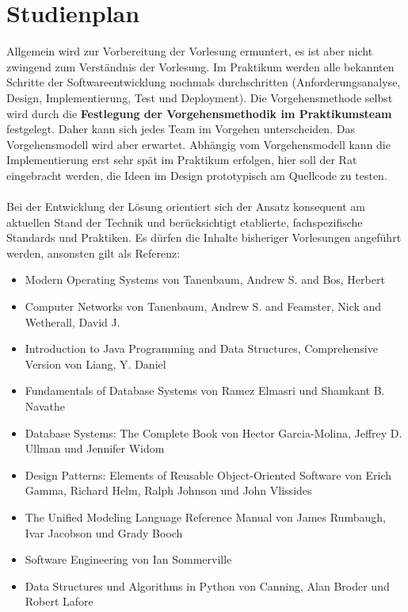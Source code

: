 \section{Studienplan}
Allgemein wird zur Vorbereitung der Vorlesung ermuntert, es ist aber nicht zwingend zum Verständnis der Vorlesung.
Im Praktikum werden alle bekannten Schritte der Softwareentwicklung nochmals durchschritten (Anforderungsanalyse, Design, Implementierung, Test und Deployment). Die Vorgehensmethode selbst wird durch die \textbf{Festlegung der Vorgehensmethodik im Praktikumsteam} festgelegt. Daher kann sich jedes Team im Vorgehen unterscheiden. Das Vorgehensmodell wird aber erwartet. Abhängig vom Vorgehensmodell kann die Implementierung erst sehr spät im Praktikum erfolgen, hier soll der Rat eingebracht werden, die Ideen im Design prototypisch am Quellcode zu testen.
\\\\
Bei der Entwicklung der Lösung orientiert sich der Ansatz konsequent am aktuellen Stand der Technik und berücksichtigt etablierte, fachspezifische Standards und Praktiken. Es dürfen die Inhalte bisheriger Vorlesungen angeführt werden, ansonsten gilt als Referenz:

\begin{itemize}
    \item Modern Operating Systems von Tanenbaum, Andrew S. and Bos, Herbert \cite{tanenbaum2022modern}
    \item Computer Networks von Tanenbaum, Andrew S. and Feamster, Nick and Wetherall, David J. \cite{tanenbaum2021computer}
    \item Introduction to Java Programming and Data Structures, Comprehensive Version von Liang, Y. Daniel \cite{liang2021java}
    \item Fundamentals of Database Systems von Ramez Elmasri und Shamkant B. Navathe \cite{elmasri_navathe_2021}
    \item Database Systems: The Complete Book von  Hector Garcia-Molina, Jeffrey D. Ullman und Jennifer Widom \cite{garcia_molina_ullman_widom_2011}
    \item Design Patterns: Elements of Reusable Object-Oriented Software von  Erich Gamma, Richard Helm, Ralph Johnson und John Vlissides \cite{gamma1994design}
    \item The Unified Modeling Language Reference Manual  von James Rumbaugh, Ivar Jacobson und Grady Booch \cite{rumbaugh_jacobson_booch_2004}
    \item Software Engineering von  Ian Sommerville \cite{sommerville2015software}
    \item Data Structures und Algorithms in Python von Canning, Alan Broder und Robert Lafore \cite{canning_broder_lafore_2023}
\end{itemize}

